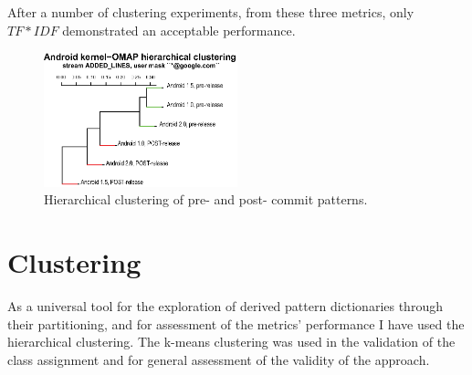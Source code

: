 \documentclass[10pt, conference, compsocconf]{IEEEtran}
\begin{document}
After a number of clustering experiments, from these three metrics, only $TF\ast IDF$ demonstrated an acceptable performance.

\begin{figure}[htb]
  \centering
  \includegraphics[width=0.5\textwidth]{figures/omap-hclust.eps}
  \caption{Hierarchical clustering of pre- and post- commit patterns.}
  \label{fig:kernel_cluster}
\end{figure}

\section{Clustering}
As a universal tool for the exploration of derived pattern dictionaries through their partitioning, 
and for assessment of the metrics' performance I have used the hierarchical clustering. The k-means
clustering was used in the validation of the class assignment and for general assessment of 
the validity of the approach.
\end{document}
